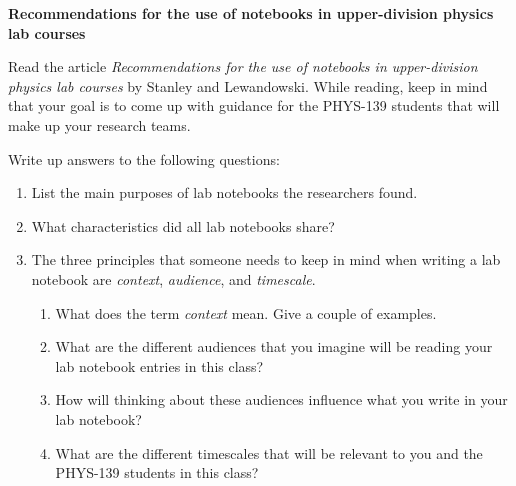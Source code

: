 \documentclass[12pt, letterpaper]{article}
\begin{document}
\textbf{\Large Recommendations for the use of notebooks in upper-division physics lab courses}

Read the article \emph{Recommendations for the use of notebooks in upper-division physics lab courses} by Stanley and Lewandowski.  While reading, keep in mind that your goal is to come up with guidance for the PHYS-139 students that will make up your research teams.

Write up answers to the following questions:

\begin{enumerate}




\item List the main purposes of lab notebooks the researchers found.

\item What characteristics did all lab notebooks share?

\item The three principles that someone needs to keep in mind when writing a lab notebook are \emph{context}, \emph{audience}, and \emph{timescale}. 

\begin{enumerate}
	\item What does the term \emph{context} mean.  Give a couple of examples.

	\item What are the different audiences that you imagine will be reading your lab notebook entries in this class?

	\item How will thinking about these audiences influence what you write in your lab notebook?

	\item What are the different timescales that will be relevant to you and the PHYS-139 students in this class? 

\end{enumerate}



\end{enumerate}
\end{document}
